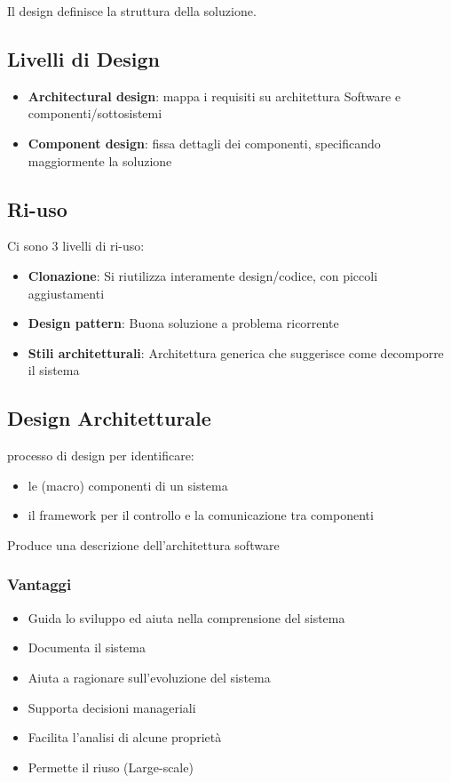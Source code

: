 Il design definisce la struttura della soluzione.

\subsection{Livelli di Design}
\begin{itemize}
    \item \textbf{Architectural design}: mappa i requisiti su architettura Software e componenti/sottosistemi
    \item \textbf{Component design}: fissa dettagli dei componenti, specificando maggiormente la soluzione
\end{itemize}

\subsection{Ri-uso}
Ci sono 3 livelli di ri-uso:
\begin{itemize}
    \item \textbf{Clonazione}: Si riutilizza interamente design/codice, con piccoli aggiustamenti
    \item \textbf{Design pattern}: Buona soluzione a problema ricorrente
    \item \textbf{Stili architetturali}: Architettura generica che suggerisce come decomporre il sistema
\end{itemize}

\subsection{Design Architetturale}
processo di design per identificare:
\begin{itemize}
    \item le (macro) componenti di un sistema
    \item il framework per il controllo e la comunicazione tra componenti
\end{itemize}

\noindent Produce una descrizione dell'architettura software 

\subsubsection{Vantaggi}
\begin{itemize}
    \item Guida lo sviluppo ed aiuta nella comprensione del sistema
    \item Documenta il sistema
    \item Aiuta a ragionare sull'evoluzione del sistema
    \item Supporta decisioni manageriali
    \item Facilita l’analisi di alcune proprietà
    \item Permette il riuso (Large-scale)
\end{itemize}

